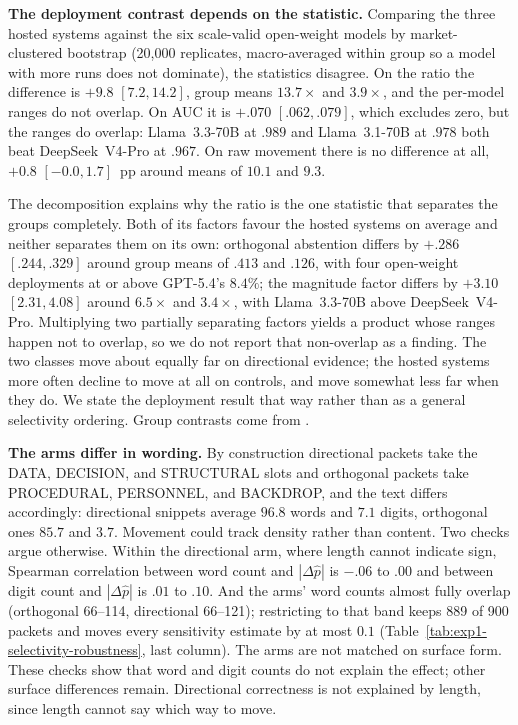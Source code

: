 \textbf{The deployment contrast depends on the statistic.} Comparing the three
hosted systems against the six scale-valid open-weight models by market-clustered
bootstrap (20{,}000 replicates, macro-averaged within group so a model with more
runs does not dominate), the statistics disagree. On the ratio the
difference is $+9.8$ $[7.2,14.2]$, group means $13.7\times$ and $3.9\times$, and
the per-model ranges do not overlap. On AUC it is $+.070$ $[.062,.079]$, which
excludes zero, but the ranges do overlap: Llama~3.3-70B at $.989$ and
Llama~3.1-70B at $.978$ both beat DeepSeek~V4-Pro at $.967$. On raw movement there
is no difference at all, $+0.8$ $[-0.0,1.7]$~pp around means of $10.1$ and $9.3$.

The decomposition explains why the ratio is the one statistic that separates the
groups completely. Both of its factors favour the hosted systems on average and
neither separates them on its own: orthogonal abstention differs by $+.286$
$[.244,.329]$ around group means of $.413$ and $.126$, with four open-weight
deployments at or above GPT-5.4's $8.4\%$; the magnitude factor differs by
$+3.10$ $[2.31,4.08]$ around $6.5\times$ and $3.4\times$, with Llama~3.3-70B
above DeepSeek~V4-Pro. Multiplying two partially separating factors yields a
product whose ranges happen not to overlap, so we do not report that non-overlap
as a finding. The two classes move about equally far on directional evidence; the
hosted systems more often decline to move at all on controls, and move somewhat
less far when they do. We state the deployment result that way rather than as a
general selectivity ordering. Group contrasts come from
.

\textbf{The arms differ in wording.} By construction directional packets take the
DATA, DECISION, and STRUCTURAL slots and orthogonal packets take PROCEDURAL,
PERSONNEL, and BACKDROP, and the text differs accordingly: directional snippets
average $96.8$ words and $7.1$ digits, orthogonal ones $85.7$ and $3.7$. Movement
could track density rather than content. Two checks argue otherwise. Within the
directional arm, where length cannot indicate sign, Spearman correlation between
word count and $|\Delta\hat p|$ is $-.06$ to $.00$ and between digit count and
$|\Delta\hat p|$ is $.01$ to $.10$. And the arms' word counts almost fully overlap
(orthogonal 66--114, directional 66--121); restricting to that band keeps 889 of
900 packets and moves every sensitivity estimate by at most $0.1$
(Table~\ref{tab:exp1-selectivity-robustness}, last column). The arms are not
matched on surface form. These checks show that word and digit counts do not
explain the effect; other surface differences remain. Directional correctness is
not explained by length, since length cannot say which way to move.

